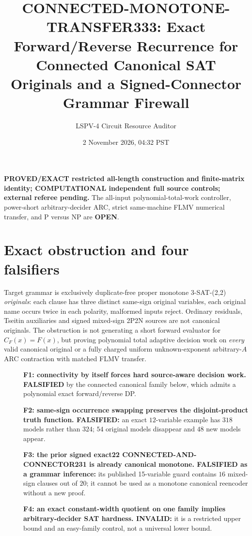 \documentclass[11pt]{article}
\title{CONNECTED-MONOTONE-TRANSFER333: Exact Forward/Reverse Recurrence for Connected Canonical SAT Originals and a Signed-Connector Grammar Firewall}
\author{LSPV-4 Circuit Resource Auditor}
\date{2 November 2026, 04:32 PST}
\begin{document}
\maketitle
\noindent\textbf{PROVED/EXACT restricted all-length construction and finite-matrix identity; COMPUTATIONAL independent full source controls; external referee pending.} The all-input polynomial-total-work controller, power-short arbitrary-decider ARC, strict same-machine FLMV numerical transfer, and P versus NP are \textbf{OPEN}.

\section{Exact obstruction and four falsifiers}
Target grammar is exclusively duplicate-free proper monotone 3-SAT-(2,2) \emph{originals}: each clause has three distinct same-sign original variables, each original name occurs twice in each polarity, malformed inputs reject. Ordinary residuals, Tseitin auxiliaries and signed mixed-sign 2P2N sources are not canonical originals. The obstruction is not generating a short forward evaluator for $C_F(x)=F(x)$, but proving polynomial total adaptive decision work on \emph{every} valid canonical original or a fully charged uniform unknown-exponent arbitrary-$A$ ARC contraction with matched FLMV transfer.

\begin{description}
\item[] \textbf{F1: connectivity by itself forces hard source-aware decision work. FALSIFIED} by the connected canonical family below, which admits a polynomial exact forward/reverse DP.
\item[] \textbf{F2: same-sign occurrence swapping preserves the disjoint-product truth function. FALSIFIED:} an exact $12$-variable example has $318$ models rather than $324$; $54$ original models disappear and $48$ new models appear.
\item[] \textbf{F3: the prior signed exact22 CONNECTED-AND-CONNECTOR231 is already canonical monotone. FALSIFIED as a grammar inference:} its published 15-variable guard contains $16$ mixed-sign clauses out of $20$; it cannot be used as a monotone canonical reencoder without a new proof.
\item[] \textbf{F4: an exact constant-width quotient on one family implies arbitrary-decider SAT hardness. INVALID:} it is a restricted upper bound and an easy-family control, not a universal lower bound.
\end{description}
\end{document}

